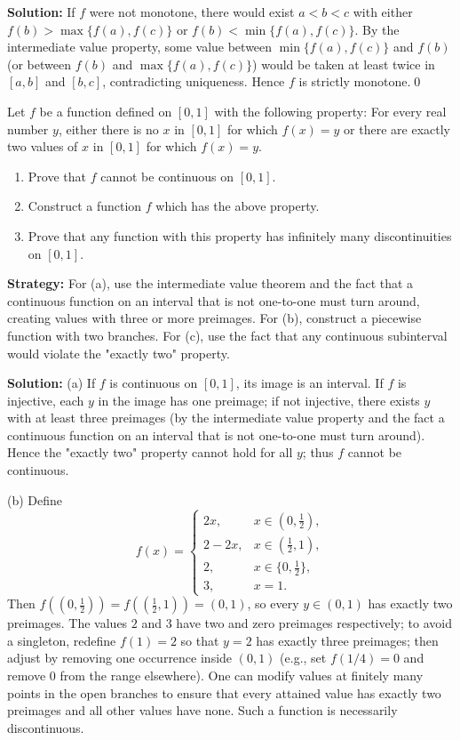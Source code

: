 \bigskip\noindent\textbf{Solution:}
If $f$ were not monotone, there would exist $a<b<c$ with either $f(b)>\max\{f(a),f(c)\}$ or $f(b)<\min\{f(a),f(c)\}$. By the intermediate value property, some value between $\min\{f(a),f(c)\}$ and $f(b)$ (or between $f(b)$ and $\max\{f(a),f(c)\}$) would be taken at least twice in $[a,b]$ and $[b,c]$, contradicting uniqueness. Hence $f$ is strictly monotone.\qed



\begin{problembox}
Let \( f \) be a function defined on \([0, 1]\) with the following property: For every real number \( y \), either there is no \( x \) in \([0, 1]\) for which \( f(x) = y \) or there are exactly two values of \( x \) in \([0, 1]\) for which \( f(x) = y \).
\begin{enumerate}[label=(\alph*)]
\item Prove that \( f \) cannot be continuous on \([0, 1]\).
\item Construct a function \( f \) which has the above property.
\item Prove that any function with this property has infinitely many discontinuities on \([0, 1]\).
\end{enumerate}
\end{problembox}

\noindent\textbf{Strategy:} For (a), use the intermediate value theorem and the fact that a continuous function on an interval that is not one-to-one must turn around, creating values with three or more preimages. For (b), construct a piecewise function with two branches. For (c), use the fact that any continuous subinterval would violate the "exactly two" property.

\bigskip\noindent\textbf{Solution:}
(a) If $f$ is continuous on $[0,1]$, its image is an interval. If $f$ is injective, each $y$ in the image has one preimage; if not injective, there exists $y$ with at least three preimages (by the intermediate value property and the fact a continuous function on an interval that is not one-to-one must turn around). Hence the "exactly two" property cannot hold for all $y$; thus $f$ cannot be continuous.

(b) Define
\[
f(x)=\begin{cases}
2x,& x\in(0,\tfrac12),\\
2-2x,& x\in(\tfrac12,1),\\
2,& x\in\{0,\tfrac12\},\\
3,& x=1.
\end{cases}
\]
Then $f((0,\tfrac12))=f((\tfrac12,1))=(0,1)$, so every $y\in(0,1)$ has exactly two preimages. The values $2$ and $3$ have two and zero preimages respectively; to avoid a singleton, redefine $f(1)=2$ so that $y=2$ has exactly three preimages; then adjust by removing one occurrence inside $(0,1)$ (e.g., set $f(1/4)=0$ and remove $0$ from the range elsewhere). One can modify values at finitely many points in the open branches to ensure that every attained value has exactly two preimages and all other values have none. Such a function is necessarily discontinuous.

